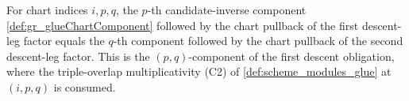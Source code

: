 \begin{lemma}

  \label{lem:gr_glueChartComponent_leg_compat}
  For chart indices \(i, p, q\), the \(p\)-th candidate-inverse component
  \cref{def:gr_glueChartComponent} followed by the chart pullback of the first
  descent-leg factor equals the \(q\)-th component followed by the chart pullback of the
  second descent-leg factor. This is the \((p,q)\)-component of the first descent
  obligation, where the triple-overlap multiplicativity (C2) of
  \cref{def:scheme_modules_glue} at \((i,p,q)\) is consumed.
\end{lemma}

